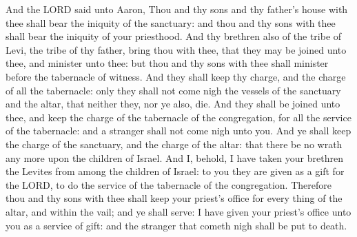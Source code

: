 And the LORD said unto Aaron, Thou and thy sons and thy
father's house with thee shall bear the iniquity of the sanctuary: and
thou and thy sons with thee shall bear the iniquity of your priesthood.
 And thy brethren also of the tribe of Levi, the tribe of
thy father, bring thou with thee, that they may be joined unto thee, and
minister unto thee: but thou and thy sons with thee shall minister
before the tabernacle of witness.  And they shall keep thy
charge, and the charge of all the tabernacle: only they shall not come
nigh the vessels of the sanctuary and the altar, that neither they, nor
ye also, die.  And they shall be joined unto thee, and
keep the charge of the tabernacle of the congregation, for all the
service of the tabernacle: and a stranger shall not come nigh unto you.
 And ye shall keep the charge of the sanctuary, and the
charge of the altar: that there be no wrath any more upon the children
of Israel.  And I, behold, I have taken your brethren the
Levites from among the children of Israel: to you they are given as a
gift for the LORD, to do the service of the tabernacle of the
congregation.  Therefore thou and thy sons with thee shall
keep your priest's office for every thing of the altar, and within the
vail; and ye shall serve: I have given your priest's office unto you as
a service of gift: and the stranger that cometh nigh shall be put to
death.

